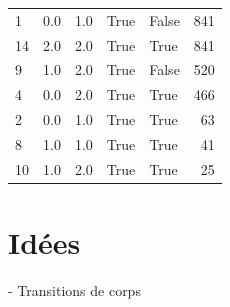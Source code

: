 \documentclass[11pt,a4paper]{article}
\begin{document}
\begin{tabular}{lrrllr}
	1  &                           0.0 &                           1.0 &            True &           False &    841 \\
	14 &                           2.0 &                           2.0 &            True &            True &    841 \\
	9  &                           1.0 &                           2.0 &            True &           False &    520 \\
	4  &                           0.0 &                           2.0 &            True &            True &    466 \\
	2  &                           0.0 &                           1.0 &            True &            True &     63 \\
	8  &                           1.0 &                           1.0 &            True &            True &     41 \\
	10 &                           1.0 &                           2.0 &            True &            True &     25 \\
	\bottomrule
\end{tabular}
\section{Idées}

- Transitions de corps
\end{document}
